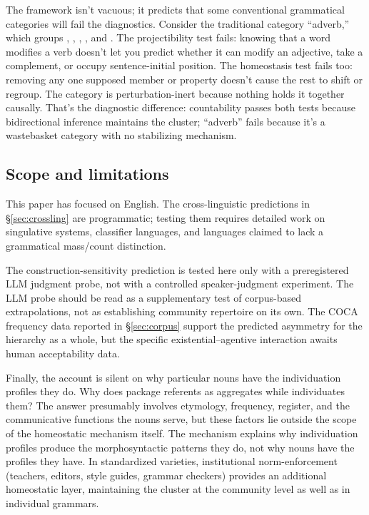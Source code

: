 \documentclass[12pt,a4paper]{article}
\begin{document}
The framework isn't vacuous; it predicts that some conventional grammatical categories will fail the diagnostics. Consider the traditional category \enquote{adverb,} which groups , , , , and . The projectibility test fails: knowing that a word modifies a verb doesn't let you predict whether it can modify an adjective, take a complement, or occupy sentence-initial position. The homeostasis test fails too: removing any one supposed member or property doesn't cause the rest to shift or regroup. The category is perturbation-inert because nothing holds it together causally. That's the diagnostic difference: countability passes both tests because bidirectional inference maintains the cluster; \enquote{adverb} fails because it's a wastebasket category with no stabilizing mechanism.

\subsection{Scope and limitations}

This paper has focused on English. The cross-linguistic predictions in \S\ref{sec:crossling} are programmatic; testing them requires detailed work on singulative systems, classifier languages, and languages claimed to lack a grammatical mass/count distinction.

The  construction-sensitivity prediction is tested here only with a preregistered LLM judgment probe, not with a controlled speaker-judgment experiment. The LLM probe should be read as a supplementary test of corpus-based extrapolations, not as establishing community repertoire on its own. The COCA frequency data reported in \S\ref{sec:corpus} support the predicted asymmetry for the hierarchy as a whole, but the specific existential--agentive interaction awaits human acceptability data.

Finally, the account is silent on why particular nouns have the individuation profiles they do. Why does  package referents as aggregates while  individuates them? The answer presumably involves etymology, frequency, register, and the communicative functions the nouns serve, but these factors lie outside the scope of the homeostatic mechanism itself. The mechanism explains why individuation profiles produce the morphosyntactic patterns they do, not why nouns have the profiles they have. In standardized varieties, institutional norm-enforcement (teachers, editors, style guides, grammar checkers) provides an additional homeostatic layer, maintaining the cluster at the community level as well as in individual grammars.
\end{document}
